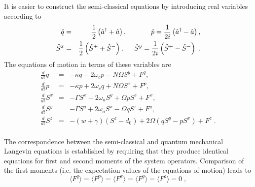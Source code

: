 \documentclass[aps,
twocolumn,
showpacs,
superscriptaddress,groupedaddress]{revtex4}
\begin{document}
It is easier to construct the semi-classical equations by introducing
real variables according to
\begin{eqnarray}
\hspace{-0.5in} \hat{q} &=&
\frac{1}{2} \left( \hat{a}^{\dagger} + \hat{a} \right),
\hspace{0.48in} \hat{p} =
\frac{1}{2i} \left( \hat{a}^{\dagger} - \hat{a} \right),
\\
\hat{S}^x &=&
\frac{1}{2} \left( \hat{S}^{+} + \hat{S}^{-} \right),
\hspace{0.2in} \hat{S}^y =
\frac{1}{2i} \left( \hat{S}^{+} - \hat{S}^{-} \right)\;.
\end{eqnarray}
The equations of motion in terms of these variables are
\begin{eqnarray}
\frac{d}{dt} q &=& -\kappa q - 2 \omega_c p - N \Omega S^{y} + F^{q},
\label{cq1}
\\
\frac{d}{dt} p&=& -\kappa p + 2 \omega_c q + N \Omega S^{x} + F^{p},
\\
\frac{d}{dt} S^{x} &=&
-\Gamma S^{x}  - 2 \omega_a S^{y} + \Omega p S^{z} + F^{x},
\\
\frac{d}{dt} S^{y} &=&
-\Gamma S^{y}  + 2 \omega_a S^{x} - \Omega q S^{z} + F^{y},
\\
\frac{d}{dt} S^{z} &=& -(w+\gamma)\left( S^{z} - d_0\right)
+2 \Omega \left( q S^{y} - p S^{x} \right)
+F^{z}\;.
\nonumber
\\
\label{eqn:cnumberlangevin}
\end{eqnarray}

The correspondence between the semi-classical and quantum mechanical
Langevin equations is established by requiring that they produce
identical equations for first and second moments of the system
operators.  Comparison of the first moments (i.e. the expectation
values of the equations of motion) leads to
\begin{equation}
\langle F^q\rangle = 
\langle F^p\rangle = 
\langle F^x\rangle = 
\langle F^y\rangle = 
\langle F^z\rangle = 0\;,
\end{equation}
\end{document}
